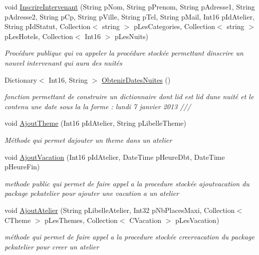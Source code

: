 \begin{DoxyCompactItemize}
void \hyperlink{class_base_de_donnees_1_1_bdd_a2ecae01b408afab3f2457286b9bc6cc7}{Inscrire\+Intervenant} (String p\+Nom, String p\+Prenom, String p\+Adresse1, String p\+Adresse2, String p\+Cp, String p\+Ville, String p\+Tel, String p\+Mail, Int16 p\+Id\+Atelier, String p\+Id\+Statut, Collection$<$ string $>$ p\+Les\+Categories, Collection$<$ string $>$ p\+Les\+Hotels, Collection$<$ Int16 $>$ p\+Les\+Nuits)
\begin{DoxyCompactList}\small\item\em Procédure publique qui va appeler la procédure stockée permettant d\textquotesingle{}inscrire un nouvel intervenant qui aura des nuités \end{DoxyCompactList}\item 
Dictionary$<$ Int16, String $>$ \hyperlink{class_base_de_donnees_1_1_bdd_af48b871d33fdfd845de9d4012109d00f}{Obtenir\+Dates\+Nuites} ()
\begin{DoxyCompactList}\small\item\em fonction permettant de construire un dictionnaire dont l\textquotesingle{}id est l\textquotesingle{}id d\textquotesingle{}une nuité et le contenu une date sous la la forme \+: lundi 7 janvier 2013 /// \end{DoxyCompactList}\item 
void \hyperlink{class_base_de_donnees_1_1_bdd_a1e3e6db107c1b88da6e57d8e008e6df4}{Ajout\+Theme} (Int16 p\+Id\+Atelier, String p\+Libelle\+Theme)
\begin{DoxyCompactList}\small\item\em Méthode qui permet d\textquotesingle{}ajouter un theme dans un atelier \end{DoxyCompactList}\item 
void \hyperlink{class_base_de_donnees_1_1_bdd_a94b0407a64c613c1b1ed1f1d57741a5e}{Ajout\+Vacation} (Int16 p\+Id\+Atelier, Date\+Time p\+Heure\+Dbt, Date\+Time p\+Heure\+Fin)
\begin{DoxyCompactList}\small\item\em methode public qui permet de faire appel a la procedure stockée ajoutvacation du package pckatelier pour ajouter une vacation a un atelier \end{DoxyCompactList}\item 
void \hyperlink{class_base_de_donnees_1_1_bdd_ad41e17409a13d72fdcc4238804ad7c54}{Ajout\+Atelier} (String p\+Libelle\+Atelier, Int32 p\+Nb\+Places\+Maxi, Collection$<$ C\+Theme $>$ p\+Les\+Themes, Collection$<$ C\+Vacation $>$ p\+Les\+Vacation)
\begin{DoxyCompactList}\small\item\em méthode qui permet de faire appel a la procedure stockée creervacation du package pckatelier pour creer un atelier \end{DoxyCompactList}\item 

\end{DoxyCompactItemize}
